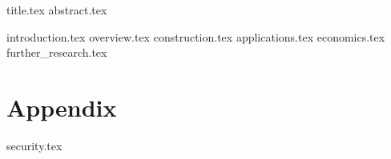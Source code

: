 \documentclass[11pt]{llncs}
\begin{document}
{title.tex}
\thispagestyle{plain}
{abstract.tex}

{introduction.tex}
{overview.tex}
{construction.tex}
{applications.tex}
{economics.tex}
{further_research.tex}

\appendix
\section*{Appendix}
{security.tex}



\end{document}
